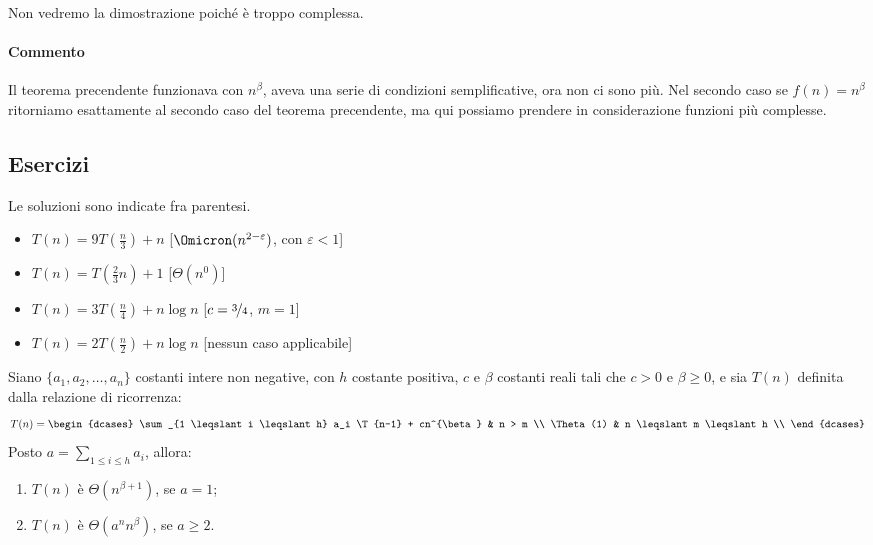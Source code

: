 Non vedremo la dimostrazione poiché è troppo complessa.

\paragraph{Commento}
Il teorema precendente funzionava con \(n^{\beta}\), aveva una serie di condizioni semplificative, ora non ci sono più.
Nel secondo caso se \(f(n) = n^{\beta}\) ritorniamo esattamente al secondo caso del teorema precendente, ma qui possiamo prendere in considerazione funzioni più complesse.

\subsection*{Esercizi}

Le soluzioni sono indicate fra parentesi.
\begin{itemize}
	\item \(T(n) = 9T(\frac{n}{3}) + n\) \hfill[\(\Omicron(n^{2-\varepsilon})\), con \(\varepsilon < 1\)]
	\item \(T(n) = T(\frac{2}{3} n) + 1\)  \hfill[\(\Theta(n^0)\)]
	\item \(T(n) = 3T(\frac{n}{4}) + n\log n\) \hfill[\(c = \nicefrac{3}{4}\), \(m = 1\)]
	\item \(T(n) = 2T(\frac{n}{2}) + n\log n\) \hfill[nessun caso applicabile]
\end{itemize}

\begin{theorem}
Siano \(\{a_1, a_2, \dots, a_n\}\) costanti intere non negative, con \(h\) costante positiva, \(c\) e \(\beta\) costanti reali tali che \(c > 0\) e \(\beta \geqslant 0\), e sia \(T(n)\) definita dalla relazione di ricorrenza:
\[
	T(n) =
	\begin{dcases}
		\sum_{1 \leqslant i \leqslant h} a_i \T{n-1} + cn^{\beta} & n > m \\
		\Theta(1) & n \leqslant m \leqslant h \\
	\end{dcases}
\]
Posto \(a = \sum_{1 \leqslant i \leqslant h} a_i\), allora:
\begin{enumerate}
	\item \(T(n)\) è \(\Theta(n^{\beta+1})\), se \(a = 1\);
	\item \(T(n)\) è \(\Theta(a^n n^{\beta})\), se \(a \geqslant 2\).
\end{enumerate}
\end{theorem}

